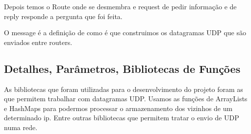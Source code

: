 \documentclass{llncs}
\begin{document}
Depois temos o Route onde se desmembra e request de pedir informação e de reply responde a pergunta que foi feita.

O message é a definição de como é que construimos os datagramas UDP que são enviados entre routers.

\subsection{Detalhes, Parâmetros, Bibliotecas de Funções}
As bibliotecas que foram utilizadas para o desenvolvimento do projeto foram as que permitem trabalhar com datagramas UDP.
Usamos as funções de ArrayLists e HashMaps para podermos processar o armazenamento dos vizinhos de um determinado ip.
Entre outras bibliotecas que permitem tratar o envio de UDP numa rede.
\end{document}
